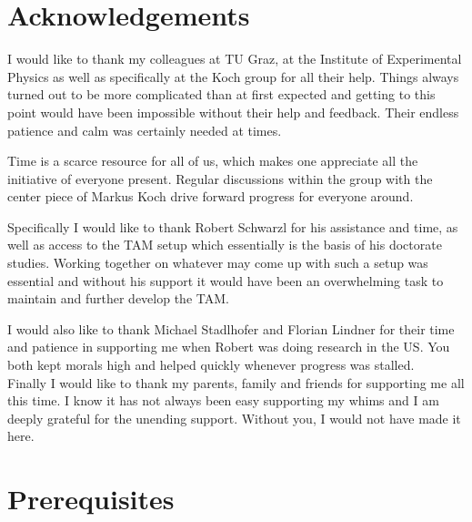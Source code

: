 \documentclass[twoside,openright,listof=numbered]{scrreprt}
\begin{document}
\chapter*{Acknowledgements}
I would like to thank my colleagues at TU Graz, at the Institute of Experimental Physics as well as specifically at the Koch group for all their help. Things always turned out to be more complicated than at first expected and getting to this point would have been impossible without their help and feedback. Their endless patience and calm was certainly needed at times. 

Time is a scarce resource for all of us, which makes one appreciate all the initiative of everyone present. Regular discussions within the group with the center piece of Markus Koch drive forward progress for everyone around.

Specifically I would like to thank Robert Schwarzl for his assistance and time, as well as access to the TAM setup which essentially is the basis of his doctorate studies. Working together on whatever may come up with such a setup was essential and without his support it would have been an overwhelming task to maintain and further develop the TAM.


I would also like to thank Michael Stadlhofer and Florian Lindner for their time and patience in supporting me when Robert was doing research in the US. You both kept morals high and helped quickly whenever progress was stalled.\\


Finally I would like to thank my parents, family and friends for supporting me all this time. I know it has not always been easy supporting my whims and I am deeply grateful for the unending support. Without you, I would not have made it here.

\tableofcontents


\chapter{Prerequisites}
\end{document}
